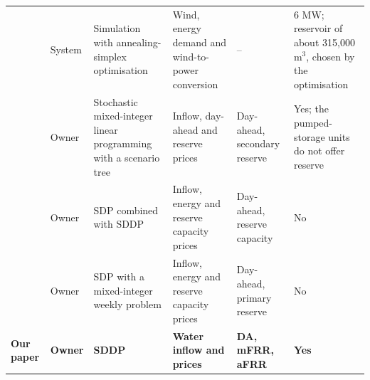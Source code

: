 \begin{table}[htbp]
\begin{tabularx}{\textwidth}{ @{} p{2.1cm} p{1.8cm} X X p{1.6cm} p{2.5cm} @{}}
\textcite{zisos2023mixing}
& System & Simulation with annealing-simplex optimisation & Wind, energy demand and wind-to-power conversion & -- & 6 MW; reservoir of about 315{,}000 m$^3$, chosen by the optimisation \\

\textcite{chazarra2016}
& Owner & Stochastic mixed-integer linear programming with a scenario tree & Inflow, day-ahead and reserve prices & Day-ahead, secondary reserve & Yes; the pumped-storage units do not offer reserve \\

\textcite{helseth2016}
& Owner & SDP combined with SDDP & Inflow, energy and reserve capacity prices & Day-ahead, reserve capacity & No \\

\textcite{helseth2017iet}
& Owner & SDP with a mixed-integer weekly problem & Inflow, energy and reserve capacity prices & Day-ahead, primary reserve & No \\

\midrule
\textbf{Our paper} & \textbf{Owner} & \textbf{SDDP} & \textbf{Water inflow and prices} & \textbf{DA, mFRR, aFRR} & \textbf{Yes} \\
\bottomrule
\end{tabularx}
\end{table}
